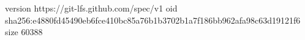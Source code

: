 version https://git-lfs.github.com/spec/v1
oid sha256:e4880fd45490eb6fce410bc85a76b1b3702b1a7f186bb962afa98c63d19121f6
size 60388
